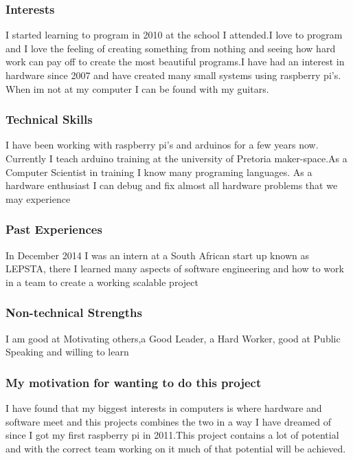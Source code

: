 \documentclass[a4paper,12pt]{article}
\begin{document}
	\subsubsection{Interests}
	I started learning to program in 2010 at the school I attended.I love to program and I love the feeling of creating something from nothing and seeing how hard work can pay off to create the most beautiful programs.I have had an interest in hardware since 2007 and have created many small systems using raspberry pi's. When im not at my computer I can be found with my guitars.  
	\subsubsection{Technical Skills}
	I have been working with raspberry pi's and arduinos for a few years now. Currently I teach arduino training at the university of Pretoria maker-space.As a Computer Scientist in training I know many programing languages. As a hardware enthusiast I can debug and fix almost all hardware problems that we may experience
	\subsubsection{Past Experiences}
	In December 2014 I was an intern at a South African start up known as LEPSTA, there I learned many aspects of software engineering and how to work in a team to create a working scalable project
	\subsubsection{Non-technical Strengths}
	I am good at Motivating others,a Good Leader, a Hard Worker, good at Public Speaking and willing to learn  			
	\subsubsection{My motivation for wanting to do this project}
	I have found that my biggest interests in computers is where hardware and software meet and this projects combines the two in a way I have dreamed of since I got my first raspberry pi in 2011.This project contains a lot of potential and with the correct team working on it much of that potential will be achieved.
		\newpage
		
\end{document}
